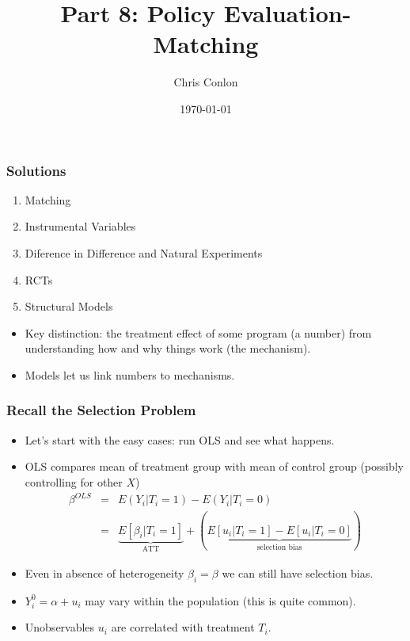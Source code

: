 \documentclass[xcolor=pdftex,dvipsnames,table,mathserif,aspectratio=169]{beamer}
\begin{document}
\title{Part 8: Policy Evaluation- Matching}
\author{Chris Conlon}
\date{\today}

\frame{\titlepage}

\begin{frame}
\frametitle{Solutions}
\begin{enumerate}
\item \alert{Matching}
\item Instrumental Variables
\item Diference in Difference and Natural Experiments
\item RCTs
\item Structural Models
\end{enumerate}
\begin{itemize}
\item Key distinction: the treatment effect of some program (a number) from understanding how and why things work (the mechanism).
\item Models let us link numbers to mechanisms.
\end{itemize}
\end{frame}

\begin{frame}
\frametitle{Recall the Selection Problem}
\begin{itemize}
\item Let's start with the easy cases: run OLS and see what happens.
\item OLS compares mean of treatment group with mean of control group (possibly controlling for other $X$)
\begin{eqnarray*}
\beta^{OLS} &=& E(Y_i | T_i =1) - E(Y_i | T_i=0) \\
&=& \underbrace{E[\beta_i | T_i =1]}_{\mbox{ATT}} + \left(\underbrace{E[u_i | T_i =1 ] - E[u_i | T_i=0] }_{\mbox{selection bias}}  \right)
\end{eqnarray*}
\item Even in absence of heterogeneity $\beta_i = \beta$ we can still have selection bias. 
\item $Y_i^0 = \alpha + u_i$ may vary within the population (this is quite common).
\item \alert{Unobservables} $u_i$ are correlated with \alert{treatment} $T_i$.
\end{itemize}
\end{frame}
\end{document}
